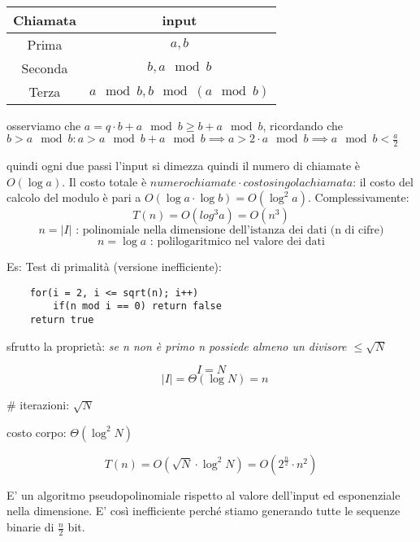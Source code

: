 \begin{table}[!ht]
    \centering
    \begin{tabular}{c|c}
        Chiamata & input \\
        \hline
        Prima & $a, b$ \\
        Seconda & $b, a \mod b$ \\
        Terza & $a \mod b, b \mod (a \mod b)$ \\
    \end{tabular}
\end{table}
osserviamo che $a = q \cdot b + a \mod b \geq b + a \mod b$, ricordando che $b > a \mod b : a > a \mod b + a \mod b \implies a > 2 \cdot a \mod b \implies a \mod b < \frac{a}{2}$

quindi ogni due passi l'input si dimezza quindi il numero di chiamate è $O\left( \log a \right)$. Il costo totale è $numero chiamate \cdot costo singola chiamata$: il costo del calcolo del modulo è pari a $O\left( \log a \cdot \log b\right ) = O\left( \log^{2}a \right)$. Complessivamente:
$$ T\left(n\right) = O\left(log^{3}a\right) = O\left( n^{3} \right) $$
$$ n = |I| \text{ : polinomiale nella dimensione dell'istanza dei dati (n di cifre)} $$
$$ n = \log a \text{ : polilogaritmico nel valore dei dati} $$

Es: Test di primalità (versione inefficiente):
\begin{verbatim}
    for(i = 2, i <= sqrt(n); i++)
        if(n mod i == 0) return false
    return true
\end{verbatim}
sfrutto la proprietà: \emph{se n non è primo n possiede almeno un divisore $\leq \sqrt{N}$}

$$ I = N $$
$$ \text{  } |I|=\Theta\left( \log N \right) = n $$

\# iterazioni: $\sqrt{N}$

costo corpo: $\Theta\left( \log^{2}N \right)$

$$ T\left(n\right) = O\left(\sqrt{N} \cdot \log^{2}N \right) = O\left(2^{\frac{n}{2}} \cdot n^{2}\right) $$

E' un algoritmo pseudopolinomiale rispetto al valore dell'input ed esponenziale nella dimensione. E' così inefficiente perché stiamo generando tutte le sequenze binarie di $\frac{n}{2}$ bit.